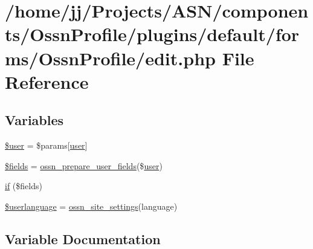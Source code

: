 \hypertarget{components_2_ossn_profile_2plugins_2default_2forms_2_ossn_profile_2edit_8php}{}\section{/home/jj/\+Projects/\+A\+S\+N/components/\+Ossn\+Profile/plugins/default/forms/\+Ossn\+Profile/edit.php File Reference}
\label{components_2_ossn_profile_2plugins_2default_2forms_2_ossn_profile_2edit_8php}
\subsection*{Variables}
\begin{DoxyCompactItemize}
\item 
\hyperlink{components_2_ossn_profile_2plugins_2default_2forms_2_ossn_profile_2edit_8php_a598ca4e71b15a1313ec95f0df1027ca5}{\$user} = \$params\mbox{[}\textquotesingle{}\hyperlink{ossn_8config_8db_8example_8php_a802544b7ba9f79bbf24ef67773d53bed}{user}\textquotesingle{}\mbox{]}
\item 
\hyperlink{components_2_ossn_profile_2plugins_2default_2forms_2_ossn_profile_2edit_8php_ab2303c817e3b402b77b7f99627b9c319}{\$fields} = \hyperlink{ossn_8lib_8users_8php_aa6c0fa7ee8f8d7d00ce56782fad5ea38}{ossn\+\_\+prepare\+\_\+user\+\_\+fields}(\$\hyperlink{ossn_8config_8db_8example_8php_a802544b7ba9f79bbf24ef67773d53bed}{user})
\item 
\hyperlink{components_2_ossn_profile_2plugins_2default_2forms_2_ossn_profile_2edit_8php_a2b3754430c8a4072d53bc0fdeff03509}{if} (\$fields)
\item 
\hyperlink{components_2_ossn_profile_2plugins_2default_2forms_2_ossn_profile_2edit_8php_aff4883de486eccc1d897858d1b8427f1}{\$userlanguage} = \hyperlink{ossn_8lib_8system_8php_a610e2045b8a86c09f777b4d82e24e34c}{ossn\+\_\+site\+\_\+settings}(\textquotesingle{}language\textquotesingle{})
\end{DoxyCompactItemize}


\subsection{Variable Documentation}
